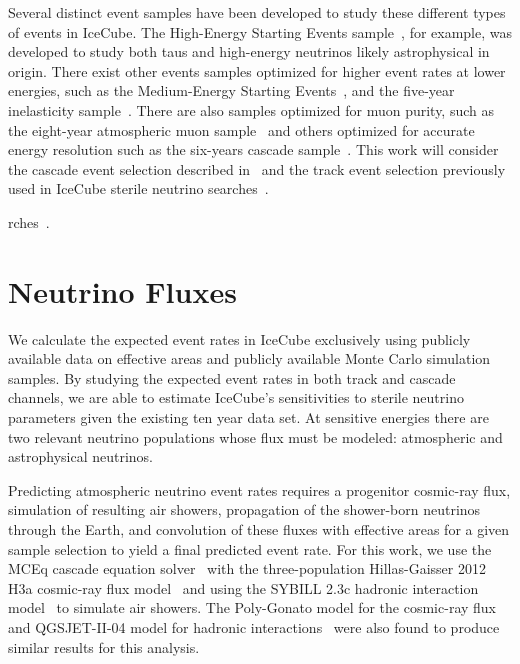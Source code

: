 \documentclass[main.tex]{subfiles}
\begin{document}
Several distinct event samples have been developed to study these different types of events in IceCube. The High-Energy Starting Events sample~\cite{2021hese}, for example, was developed to study both taus and high-energy neutrinos likely astrophysical in origin. There exist other events samples optimized for higher event rates at lower energies, such as the Medium-Energy Starting Events~\cite{PhysRevDoverone}, and the five-year inelasticity sample~\cite{inelasticity2019}. There are also samples optimized for muon purity, such as the eight-year atmospheric muon sample~\cite{Aartsen_2020_prd} and others optimized for accurate energy resolution such as the six-years cascade sample~\cite{sixyrscascade}. This work will consider the cascade event selection described in~\cite{2018PhDT17N} and the track event selection previously used in IceCube sterile neutrino searches~\cite{PhysRevLett.117.071801}.

rches~\cite{PhysRevLett.117.071801}.

\section{\label{sec:flux} Neutrino Fluxes}

We calculate the expected event rates in IceCube exclusively using publicly available data on effective areas and publicly available Monte Carlo simulation samples. By studying the expected event rates in both track and cascade channels, we are able to estimate IceCube's sensitivities to sterile neutrino parameters given the existing ten year data set. 
At sensitive energies there are two relevant neutrino populations whose flux must be modeled: atmospheric and astrophysical neutrinos. 

Predicting atmospheric neutrino event rates requires a progenitor cosmic-ray flux, simulation of resulting air showers, propagation of the shower-born neutrinos through the Earth, and convolution of these fluxes with effective areas for a given sample selection to yield a final predicted event rate. 
For this work, we use the MCEq cascade equation solver~\cite{fedynitch2015calculation} with the three-population Hillas-Gaisser 2012 H3a cosmic-ray flux model~\cite{GAISSER2012801} and using the SYBILL 2.3c hadronic interaction model~\cite{Riehn:2017mfm} to simulate air showers.
The Poly-Gonato model for the cosmic-ray flux~\cite{polygonato2003} and QGSJET-II-04 model for hadronic interactions~\cite{qgsjet2011} were also found to produce similar results for this analysis. 
\end{document}
